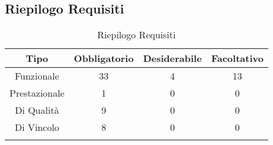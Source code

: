 \subsection{Riepilogo Requisiti}
\normalsize
\begin{longtable}{|c|c|c|c|}
	\hline 
	\textbf{Tipo} & \textbf{Obbligatorio} & \textbf{Desiderabile} & \textbf{Facoltativo}\\
	\hline
	Funzionale & 33 & 4 & 13\\ \hline
	Prestazionale & 1 & 0 & 0\\ \hline
	Di Qualità & 9 & 0 & 0\\ \hline
	Di Vincolo & 8 & 0 & 0\\ \hline
	\caption[Riepilogo Requisiti]{Riepilogo Requisiti}
	\label{tabella:riepilogorequi}
\end{longtable}
\clearpage
